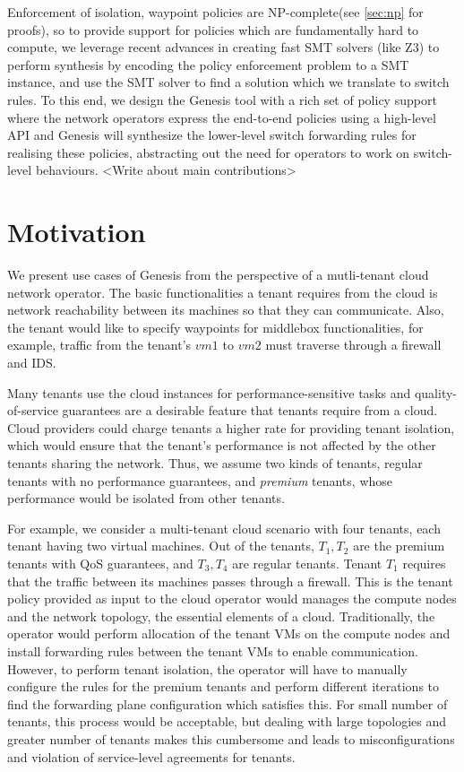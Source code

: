 \documentclass[]{sig}
\begin{document}
 Enforcement of isolation, waypoint policies are NP-complete(see \cref{sec:np} for proofs), so to provide support for policies which are fundamentally hard to compute, we leverage recent advances in creating fast SMT solvers (like Z3) to perform synthesis by encoding the policy enforcement problem to a SMT instance, and use the SMT solver to find a solution which we translate to switch rules. To this end, we design the Genesis tool with a rich set of policy support where the network operators express the end-to-end policies using a high-level API and Genesis will synthesize the lower-level switch forwarding rules for realising these policies, abstracting out the need for operators to work on switch-level behaviours. 
<Write about main contributions> 
\section{Motivation}
We present use cases of Genesis from the perspective of a mutli-tenant cloud network operator. The basic functionalities a tenant requires from the cloud is network reachability between its machines so that they can communicate. Also, the tenant would like to specify waypoints for middlebox functionalities, for example, traffic from the tenant's $vm1$ to $vm2$ must traverse through a firewall and IDS. 

Many tenants use the cloud instances for performance-sensitive tasks and quality-of-service guarantees are a desirable feature that tenants require from a cloud. Cloud providers could charge tenants a higher rate for providing tenant isolation, which would ensure that the tenant's performance is not affected by the other tenants sharing the network. Thus, we assume two kinds of tenants, regular tenants with no performance guarantees, and \emph{premium} tenants, whose performance would be isolated from other tenants. 

For example, we consider a multi-tenant cloud scenario with four tenants, each tenant having two virtual machines. Out of the tenants, $T_1, T_2$ are the premium tenants with QoS guarantees, and $T_3, T_4$ are regular tenants. Tenant $T_1$ requires that the traffic between its machines passes through a firewall. This is the tenant policy provided as input to the cloud operator would manages the compute nodes and the network topology, the essential elements of a cloud. Traditionally, the operator would perform allocation of the tenant VMs on the compute nodes and install forwarding rules between the tenant VMs to enable communication. However, to perform tenant isolation, the operator will have to manually configure the rules for the premium tenants and perform different iterations to find the forwarding plane configuration which satisfies this. For small number of tenants, this process would be acceptable, but dealing with large topologies and greater number of tenants makes this cumbersome and leads to misconfigurations and violation of service-level agreements for tenants. 
\end{document}
